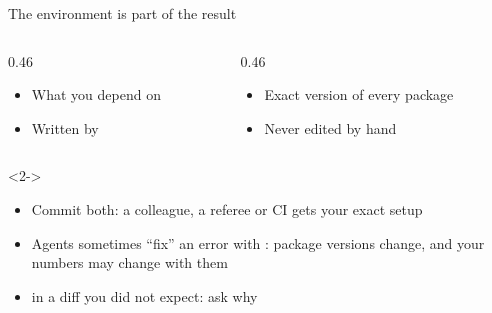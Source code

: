 \begin{frame}[fragile]{The environment is part of the result}
  \begin{columns}[T]
    \begin{column}{0.46\textwidth}
      \textbf{}
      \begin{itemize}
        \item What you depend on
        \item Written by 
      \end{itemize}
    \end{column}
    \begin{column}{0.46\textwidth}
      \textbf{}
      \begin{itemize}
        \item Exact version of every package
        \item Never edited by hand
      \end{itemize}
    \end{column}
  \end{columns}
  \vspace{1ex}
\begin{onlyenv}<2->
\end{onlyenv}
  \begin{itemize}
    \item<3-> Commit both: a colleague, a referee or CI gets your exact setup
    \item<4-> Agents sometimes ``fix'' an error with : package versions
          change, and your numbers may change with them
    \item<5->  in a diff you did not expect: ask why
  \end{itemize}
\end{frame}


